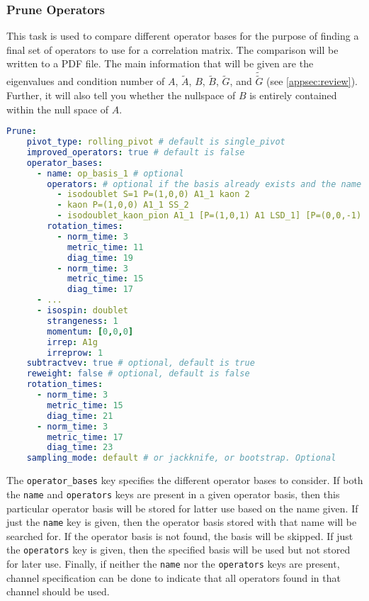 \documentclass[12pt,letterpaper,notitlepage]{article}
\newcommand{\key}[1]{\textcolor{Emerald}{\texttt{\small{#1}}}}
\begin{document}
\subsubsection{Prune Operators}

This task is used to compare different operator bases for the purpose of finding a final set of operators to use for a correlation matrix.
The comparison will be written to a \textsc{PDF} file.
The main information that will be given are the eigenvalues and condition number of $A$, $\widetilde{A}$, $B$, $\widetilde{B}$, $\widetilde{G}$, and $\widetilde{\widetilde{G}}$
(see \autoref{appsec:review}).
Further, it will also tell you whether the nullspace of $B$ is entirely contained within the null space of $A$.
\begin{lstlisting}[language=yaml]
  Prune:
    pivot_type: rolling_pivot # default is single_pivot
    improved_operators: true # default is false
    operator_bases:
      - name: op_basis_1 # optional
        operators: # optional if the basis already exists and the name is given
          - isodoublet S=1 P=(1,0,0) A1_1 kaon 2
          - kaon P=(1,0,0) A1_1 SS_2
          - isodoublet_kaon_pion A1_1 [P=(1,0,1) A1 LSD_1] [P=(0,0,-1) A2 TSD_2]
        rotation_times:
          - norm_time: 3
            metric_time: 11
            diag_time: 19
          - norm_time: 3
            metric_time: 15
            diag_time: 17
      - ... 
      - isospin: doublet
        strangeness: 1
        momentum: [0,0,0]
        irrep: A1g
        irreprow: 1
    subtractvev: true # optional, default is true
    reweight: false # optional, default is false
    rotation_times:
      - norm_time: 3
        metric_time: 15
        diag_time: 21
      - norm_time: 3
        metric_time: 17
        diag_time: 23
    sampling_mode: default # or jackknife, or bootstrap. Optional
\end{lstlisting}
The \key{operator\_bases} key specifies the different operator bases to consider.
If both the \key{name} and \key{operators} keys are present in a given operator basis,
then this particular operator basis will be stored for latter use based on the name given.
If just the \key{name} key is given, then the operator basis stored with that name will be searched for.
If the operator basis is not found, the basis will be skipped.
If just the \key{operators} key is given, then the specified basis will be used but not stored for later use.
Finally, if neither the \key{name} nor the \key{operators} keys are present, channel specification can be done
to indicate that all operators found in that channel should be used.
\end{document}
